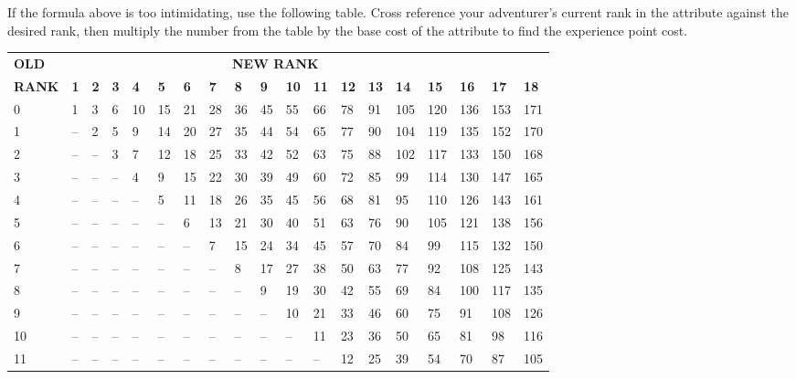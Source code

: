 If the formula above is too intimidating, use the following table. Cross reference your adventurer's current rank in the attribute against the desired rank, then multiply the number from the table by the base cost of the attribute to find the experience point cost.
\begin{center}
\begin{normbox}
\small
\begin{tabular}{@{}l l l l l l l l l l l l l l l l l l l}
\textbf{OLD} & \multicolumn{16}{c}{\textbf{NEW RANK}}\\
\textbf{RANK} & \textbf{1} & \textbf{2} & \textbf{3} & \textbf{4} & \textbf{5} & \textbf{6} & \textbf{7} & \textbf{8} & \textbf{9} & \textbf{10} & \textbf{11} & \textbf{12} & \textbf{13} & \textbf{14} & \textbf{15} & \textbf{16} & \textbf{17} & \textbf{18}\\
0 & 1 & 3 & 6 & 10 & 15 & 21 & 28 & 36 & 45 & 55 & 66 & 78 & 91 & 105 & 120 & 136 & 153 & 171\\
1 & -- & 2 & 5 & 9 & 14 & 20 & 27 & 35 & 44 & 54 & 65 & 77 & 90 & 104 & 119 & 135 & 152 & 170\\
2 & -- & -- & 3 & 7 & 12 & 18 & 25 & 33 & 42 & 52 & 63 & 75 & 88 & 102 & 117 & 133 & 150 & 168\\
3 & -- & -- & -- & 4 & 9 & 15 & 22 & 30 & 39 & 49 & 60 & 72 & 85 & 99 & 114 & 130 & 147 & 165\\
4 & -- & -- & -- & -- & 5 & 11 & 18 & 26 & 35 & 45 & 56 & 68 & 81 & 95 & 110 & 126 & 143 & 161\\
5 & -- & -- & -- & -- & -- & 6 & 13 & 21 & 30 & 40 & 51 & 63 & 76 & 90 & 105 & 121 & 138 & 156\\
6 & -- & -- & -- & -- & -- & -- & 7 & 15 & 24 & 34 & 45 & 57 & 70 & 84 & 99 & 115 & 132 & 150\\
7 & -- & -- & -- & -- & -- & -- & -- & 8 & 17 & 27 & 38 & 50 & 63 & 77 & 92 & 108 & 125 & 143\\
8 & -- & -- & -- & -- & -- & -- & -- & -- & 9 & 19 & 30 & 42 & 55 & 69 & 84 & 100 & 117 & 135\\
9 & -- & -- & -- & -- & -- & -- & -- & -- & -- & 10 & 21 & 33 & 46 & 60 & 75 & 91 & 108 & 126\\
10 & -- & -- & -- & -- & -- & -- & -- & -- & -- & -- & 11 & 23 & 36 & 50 & 65 & 81 & 98 & 116\\
11 & -- & -- & -- & -- & -- & -- & -- & -- & -- & -- & -- & 12 & 25 & 39 & 54 & 70 & 87 & 105\\

\end{tabular}
\end{normbox}
\end{center}
